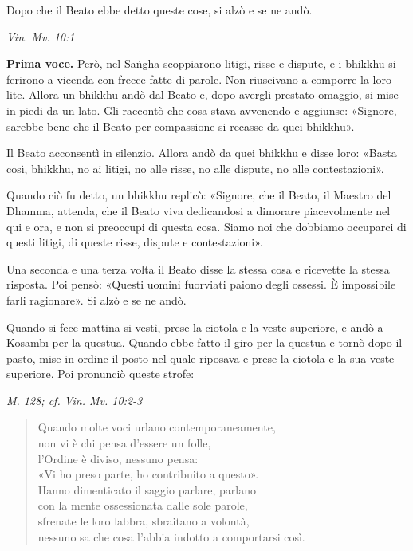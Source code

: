 Dopo che il Beato ebbe detto queste cose, si alzò e se ne andò.


\emph{Vin. Mv. 10:1}


\textbf{Prima voce.} Però, nel Saṅgha scoppiarono litigi, risse e dispute, e i
bhikkhu si ferirono a vicenda con frecce fatte di parole. Non riuscivano
a comporre la loro lite. Allora un bhikkhu andò dal Beato e, dopo
avergli prestato omaggio, si mise in piedi da un lato. Gli raccontò che
cosa stava avvenendo e aggiunse: «Signore, sarebbe bene che il Beato per
compassione si recasse da quei bhikkhu».


Il Beato acconsentì in silenzio. Allora andò da quei bhikkhu e disse
loro: «Basta così, bhikkhu, no ai litigi, no alle risse, no alle
dispute, no alle contestazioni».


Quando ciò fu detto, un bhikkhu replicò: «Signore, che il Beato, il
Maestro del Dhamma, attenda, che il Beato viva dedicandosi a dimorare
piacevolmente nel qui e ora, e non si preoccupi di questa cosa. Siamo
noi che dobbiamo occuparci di questi litigi, di queste risse, dispute e
contestazioni».


Una seconda e una terza volta il Beato disse la stessa cosa e ricevette
la stessa risposta. Poi pensò: «Questi uomini fuorviati paiono degli
ossessi. È impossibile farli ragionare». Si alzò e se ne andò.


Quando si fece mattina si vestì, prese la ciotola e la veste superiore,
e andò a Kosambī per la questua. Quando ebbe fatto il giro per la
questua e tornò dopo il pasto, mise in ordine il posto nel quale
riposava e prese la ciotola e la sua veste superiore. Poi pronunciò
queste strofe:


\emph{M. 128; cf. Vin. Mv. 10:2-3}


\begin{quotation}
Quando molte voci urlano contemporaneamente, \\
non vi è chi pensa d’essere un folle, \\
l’Ordine è diviso, nessuno pensa: \\
«Vi ho preso parte, ho contribuito a questo». \\
Hanno dimenticato il saggio parlare, parlano \\
con la mente ossessionata dalle sole parole, \\
sfrenate le loro labbra, sbraitano a volontà, \\
nessuno sa che cosa l’abbia indotto a comportarsi così.
\end{quotation}


